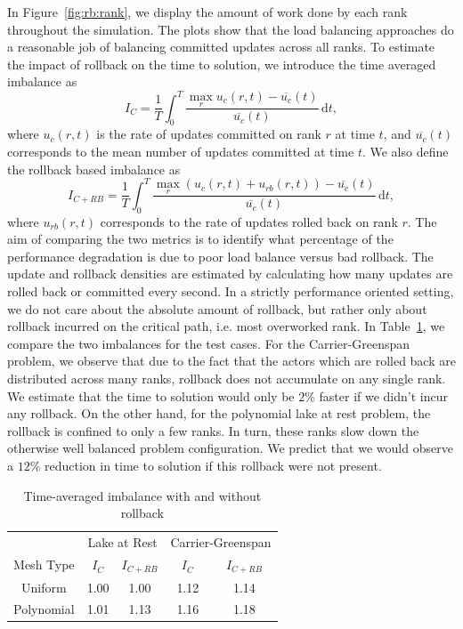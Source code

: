 \documentclass[10pt,letterpaper]{article}
\begin{document}
In Figure~\ref{fig:rb:rank}, we display the amount of work done by each rank throughout the simulation. The plots show that the load balancing approaches do a reasonable job of balancing committed updates across all ranks. To estimate the impact of rollback on the time to solution, we introduce the time averaged imbalance as
\begin{equation*}
I_C = \frac{1}{T}\int_0^T \frac{ \max_r u_c(r, t) - \overline{u_c}(t)}{\overline{u_c}(t) } \,\mathrm{d} t,
\end{equation*}
where $u_c(r,t)$ is the rate of updates committed on rank $r$ at time $t$, and $\overline{u_c}(t)$ corresponds to the mean number of updates committed at time $t$. We also define the rollback based imbalance as
\begin{equation*}
I_{C+RB} = \frac{1}{T} \int_0^T \frac{ \max_r \left(u_c(r,t) + u_{rb}(r,t) \right)- \overline{u_c}(t)}{\overline{u_c}(t) } \,\mathrm{d} t,
\end{equation*}
where $u_{rb}(r,t)$ corresponds to the rate of updates rolled back on rank $r$. The aim of comparing the two metrics is to identify what percentage of the performance degradation is due to poor load balance versus bad rollback. The update and rollback densities are estimated by calculating how many updates are rolled back or committed every second.
In a strictly performance oriented setting, we do not care about the absolute amount of rollback, but rather only about rollback incurred on the critical path, i.e. most overworked rank. In Table~\ref{tab:rb:imb}, we compare the two imbalances for the test cases. For the Carrier-Greenspan problem, we observe that due to the fact that the actors which are rolled back are distributed across many ranks, rollback does not accumulate on any single rank. We estimate that the time to solution would only be $2\%$ faster if we didn't incur any rollback. On the other hand, for the polynomial lake at rest problem, the rollback is confined to only a few ranks. In turn, these ranks slow down the otherwise well balanced problem configuration. We predict that we would observe a $12\%$ reduction in time to solution if this rollback were not present.

\begin{table}
\centering
\begin{tabular}{|c | c c c c|}
\hline & \multicolumn{2}{c}{Lake at Rest} & \multicolumn{2}{c|}{Carrier-Greenspan} \\
Mesh Type& $I_C$ & $I_{C+RB}$ & $I_C$ & $I_{C+RB}$ \\ \hline
Uniform  & 1.00 & 1.00 & 1.12 & 1.14\\ \hline
Polynomial & 1.01 & 1.13 & 1.16 & 1.18\\ \hline
\end{tabular}
\caption{Time-averaged imbalance with and without rollback}
\label{tab:rb:imb}
\end{table}
\end{document}
